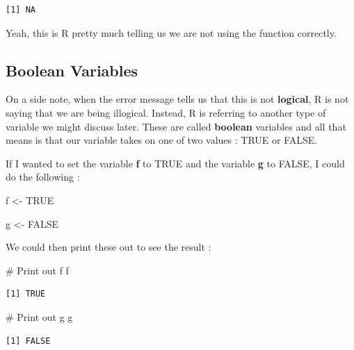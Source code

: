 \documentclass[
  letterpaper,
  DIV=11,
  numbers=noendperiod]{scrreprt}
\newenvironment{Shaded}{\begin{snugshade}}{\end{snugshade}}
\newcommand{\CommentTok}[1]{\textcolor[rgb]{0.37,0.37,0.37}{#1}}
\newcommand{\ConstantTok}[1]{\textcolor[rgb]{0.56,0.35,0.01}{#1}}
\newcommand{\NormalTok}[1]{\textcolor[rgb]{0.00,0.23,0.31}{#1}}
\newcommand{\OtherTok}[1]{\textcolor[rgb]{0.00,0.23,0.31}{#1}}
\begin{document}
\begin{verbatim}
[1] NA
\end{verbatim}

Yeah, this is R pretty much telling us we are not using the function
correctly.

\subsection*{Boolean Variables}\label{boolean-variables}

On a side note, when the error message tells us that this is not
\textbf{logical}, R is not saying that we are being illogical. Instead,
R is referring to another type of variable we might discuss later. These
are called \textbf{boolean} variables and all that means is that our
variable takes on one of two values : TRUE or FALSE.

If I wanted to set the variable \textbf{f} to TRUE and the variable
\textbf{g} to FALSE, I could do the following :

\begin{Shaded}
\begin{Highlighting}[]
\NormalTok{f }\OtherTok{\textless{}{-}} \ConstantTok{TRUE}

\NormalTok{g }\OtherTok{\textless{}{-}} \ConstantTok{FALSE}
\end{Highlighting}
\end{Shaded}

We could then print these out to see the result :

\begin{Shaded}
\begin{Highlighting}[]
\CommentTok{\# Print out f}
\NormalTok{f}
\end{Highlighting}
\end{Shaded}

\begin{verbatim}
[1] TRUE
\end{verbatim}

\begin{Shaded}
\begin{Highlighting}[]
\CommentTok{\# Print out g}
\NormalTok{g}
\end{Highlighting}
\end{Shaded}

\begin{verbatim}
[1] FALSE
\end{verbatim}

\end{document}
